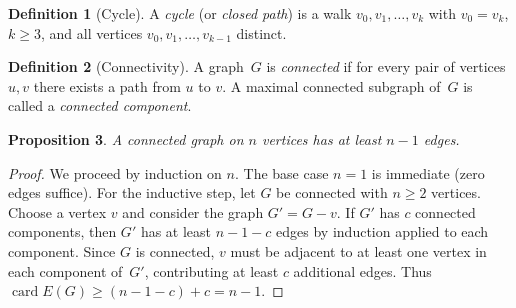\documentclass[12pt,a4paper,openany]{book}
\theoremstyle{definition}
\newtheorem{definition}{Definition}[chapter]
\theoremstyle{plain}
\newtheorem{proposition}[definition]{Proposition}
\theoremstyle{remark}
\DeclareMathOperator{\card}{card}
\begin{document}
\begin{definition}[Cycle]\label{def:cycle}
A \emph{cycle} (or \emph{closed path}) is a walk $v_0, v_1, \dots, v_k$
with $v_0 = v_k$, $k \ge 3$, and all vertices $v_0, v_1, \dots, v_{k-1}$
distinct.
\end{definition}

\begin{definition}[Connectivity]\label{def:connectivity}
A graph~$G$ is \emph{connected} if for every pair of vertices $u, v$
there exists a path from $u$ to $v$.  A maximal connected subgraph
of~$G$ is called a \emph{connected component}.
\end{definition}

\begin{proposition}\label{prop:connected-edges}
A connected graph on $n$ vertices has at least $n - 1$ edges.
\end{proposition}

\begin{proof}
We proceed by induction on $n$.  The base case $n = 1$ is immediate
(zero edges suffice).  For the inductive step, let $G$ be connected
with $n \ge 2$ vertices.  Choose a vertex $v$ and consider the graph
$G' = G - v$.  If $G'$ has $c$ connected components, then $G'$ has at
least $n - 1 - c$ edges by induction applied to each component.  Since
$G$ is connected, $v$ must be adjacent to at least one vertex in each
component of~$G'$, contributing at least $c$ additional edges.  Thus
$\card{E(G)} \ge (n - 1 - c) + c = n - 1$.
\end{proof}

\begin{center}
\label{fig:components}
\end{center}
\end{document}
